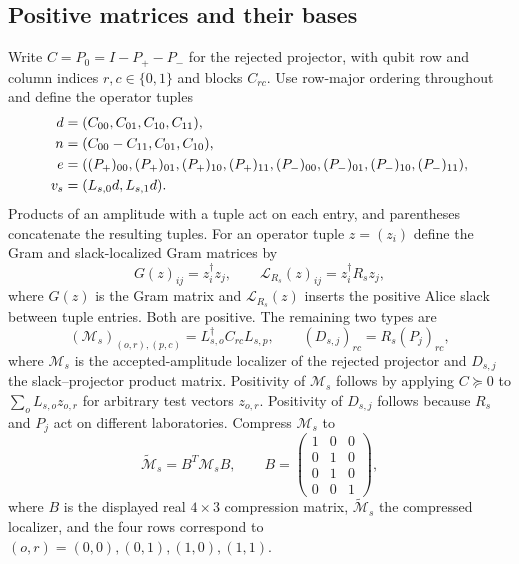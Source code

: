 \documentclass[11pt]{article}
\begin{document}
\subsection{Positive matrices and their bases}
Write $C=P_0=I-P_+-P_-$ for the rejected projector, with qubit row and column indices $r,c\in\{0,1\}$ and blocks $C_{rc}$. Use row-major ordering throughout and define the operator tuples
\begin{align}
 d&=(C_{00},C_{01},C_{10},C_{11}),\notag\\
 n&=(C_{00}-C_{11},C_{01},C_{10}),\notag\\
 e&=((P_+)_{00},(P_+)_{01},(P_+)_{10},(P_+)_{11},
       (P_-)_{00},(P_-)_{01},(P_-)_{10},(P_-)_{11}),\notag\\
 v_s&=(L_{s,0}d,L_{s,1}d).
 \label{eq:SOS-bases}
\end{align}
Products of an amplitude with a tuple act on each entry, and parentheses concatenate the resulting tuples. For an operator tuple $z=(z_i)$ define the Gram and slack-localized Gram matrices by
\begin{equation}
 G(z)_{ij}=z_i^\dagger z_j,\qquad
 \mathcal L_{R_s}(z)_{ij}=z_i^\dagger R_s z_j,
 \label{eq:SOS-gram}
\end{equation}
where $G(z)$ is the Gram matrix and $\mathcal L_{R_s}(z)$ inserts the positive Alice slack between tuple entries. Both are positive. The remaining two types are
\begin{equation}
 (\mathcal M_s)_{(o,r),(p,c)}=L_{s,o}^\dagger C_{rc}L_{s,p},\qquad
 (D_{s,j})_{rc}=R_s(P_j)_{rc},
 \label{eq:SOS-localizers}
\end{equation}
where $\mathcal M_s$ is the accepted-amplitude localizer of the rejected projector and $D_{s,j}$ the slack--projector product matrix. Positivity of $\mathcal M_s$ follows by applying $C\succeq0$ to $\sum_oL_{s,o}z_{o,r}$ for arbitrary test vectors $z_{o,r}$. Positivity of $D_{s,j}$ follows because $R_s$ and $P_j$ act on different laboratories. Compress $\mathcal M_s$ to
\begin{equation}
 \widetilde{\mathcal M}_s=B^T\mathcal M_sB,\qquad
 B=\begin{pmatrix}1&0&0\\0&1&0\\0&1&0\\0&0&1\end{pmatrix},
 \label{eq:SOS-triplet}
\end{equation}
where $B$ is the displayed real $4\times3$ compression matrix, $\widetilde{\mathcal M}_s$ the compressed localizer, and the four rows correspond to $(o,r)=(0,0),(0,1),(1,0),(1,1)$.
\end{document}
